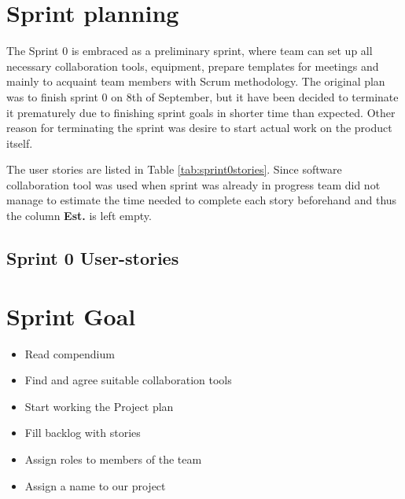 \section{Sprint planning}
The Sprint 0 is embraced as a preliminary sprint, where team can set up all necessary collaboration tools, equipment, prepare templates for meetings and mainly to acquaint team members with Scrum methodology. The original plan was to finish sprint 0 on 8th of September, but it have been decided to terminate it prematurely due to finishing sprint goals in shorter time than expected. Other reason for terminating the sprint was desire to start actual work on the product itself.

The user stories are listed in Table \ref{tab:sprint0stories}. Since software collaboration tool was used when sprint was already in progress team did not manage to estimate the time needed to complete each story beforehand and thus the column \textbf{Est.} is left empty.

\subsection{Sprint 0 User-stories}




\section{Sprint Goal}
\begin{itemize}
    \item Read compendium
    \item Find and agree suitable collaboration tools
    \item Start working the Project plan
    \item Fill backlog with stories
    \item Assign roles to members of the team
    \item Assign a name to our project
\end{itemize}

